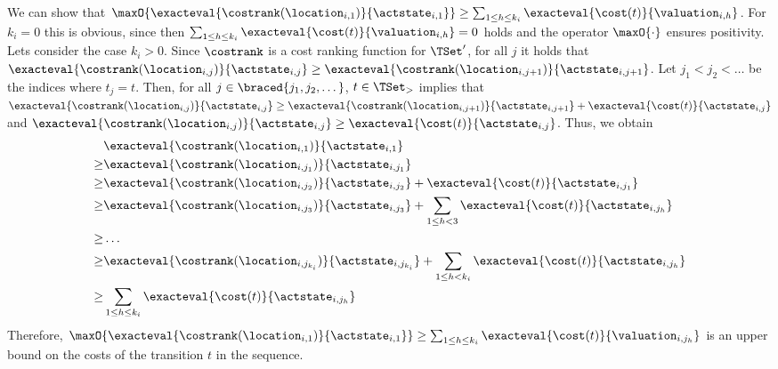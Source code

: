 We can show that $\maxO{\exacteval{\costrank(\location_{i,1})}{\actstate_{i,1}}} \geq \sum_{1 \leq h \leq {k_i}} \exacteval{\cost(t)}{\valuation_{i,h}}$.
For $k_i = 0$ this is obvious, since then $\sum_{1 \leq h \leq {k_i}} \exacteval{\cost(t)}{\valuation_{i,h}} = 0$ holds and the operator $\maxO{\cdot}$ ensures positivity.
Lets consider the case $k_i > 0$.
Since $\costrank$ is a cost ranking function for $\TSet'$, for all $j$ it holds that $\exacteval{\costrank(\location_{i,j})}{\actstate_{i,j}} \geq \exacteval{\costrank(\location_{i,j+1})}{\actstate_{i,j+1}}$.
Let $j_1 < j_2 < \dots$ be the indices where $t_j = t$.
Then, for all $j \in \braced{j_1, j_2, \dots}$, $t \in \TSet_>$ implies that $\exacteval{\costrank(\location_{i,j})}{\actstate_{i,j}} \geq \exacteval{\costrank(\location_{i,j+1})}{\actstate_{i,j+1}} + \exacteval{\cost(t)}{\actstate_{i,j}}$ and $\exacteval{\costrank(\location_{i,j})}{\actstate_{i,j}} \geq \exacteval{\cost(t)}{\actstate_{i,j}}$.
Thus, we obtain
\begin{align*}
  & \exacteval{\costrank(\location_{i,1})}{\actstate_{i,1}} \\
  \geq & \exacteval{\costrank(\location_{i,j_1})}{\actstate_{i,j_1}} \\
  \geq & \exacteval{\costrank(\location_{i,j_2})}{\actstate_{i,j_2}} + \exacteval{\cost(t)}{\actstate_{i,j_1}} \\
  \geq & \exacteval{\costrank(\location_{i,j_3})}{\actstate_{i,j_3}} + \sum_{1 \leq h < 3} \exacteval{\cost(t)}{\actstate_{i,j_h}} \\
  \geq & \dots \\
  \geq & \exacteval{\costrank(\location_{i,j_{k_i}})}{\actstate_{i,j_{k_i}}} + \sum_{1 \leq h < k_i} \exacteval{\cost(t)}{\actstate_{i,j_h}} \\
  \geq & \sum_{1 \leq h \leq k_i} \exacteval{\cost(t)}{\actstate_{i,j_h}}
\end{align*}
Therefore, $\maxO{\exacteval{\costrank(\location_{i,1})}{\actstate_{i,1}}} \geq \sum_{1 \leq h \leq {k_i}} \exacteval{\cost(t)}{\valuation_{i,j_h}}$ is an upper bound on the costs of the transition $t$ in the sequence.


